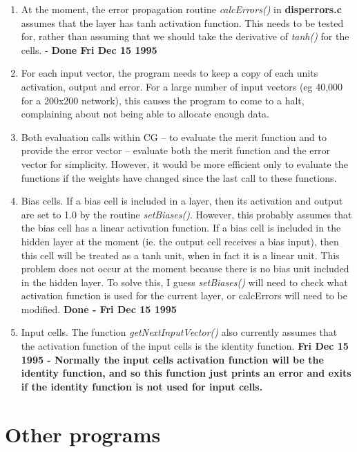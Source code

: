 \documentclass[a4paper]{article}
\begin{document}
\begin{enumerate}
\item 
  At the moment, the error propagation routine {\em calcErrors()} in
  {\bf disperrors.c} assumes that the layer has tanh activation function.
  This needs to be tested for, rather than assuming that we should take
  the derivative of {\em tanh()} for the cells. - {\bf Done Fri Dec 15
    1995}

\item 
  For each input vector, the program needs to keep a copy of each units
  activation, output and error.  For a large number of input vectors (eg
  40,000 for a 200x200 network), this causes the program to come to a
  halt, complaining about not being able to allocate enough data. 


\item Both evaluation calls within CG -- to evaluate the merit
  function and to provide the error vector -- evaluate both the merit
  function and the error vector for simplicity.  However, it would be
  more efficient only to evaluate the functions if the weights have
  changed since the last call to these functions.

\item Bias cells.  If a bias cell is included in a layer, then its
  activation and output are set to 1.0 by the routine {\em setBiases()}.
  However, this probably assumes that the bias cell has a linear
  activation function.  If a bias cell is included in the hidden layer
  at the moment (ie. the output cell receives a bias input), then this
  cell will be treated as a tanh unit, when in fact it is a linear
  unit.   This problem does not occur at the moment because there is
  no bias unit included in the hidden layer.  To solve this, I guess
  {\em setBiases()} will need to check what activation function is used for
  the current layer, or calcErrors will need to be modified.
  \textbf{Done - Fri Dec 15 1995}

\item Input cells.  The function {\em getNextInputVector()} also currently
  assumes that the activation function of the input cells is the
  identity function.  \textbf{Fri Dec 15 1995 - Normally the input
    cells activation function will be the identity function, and so
    this function just prints an error and exits if the identity
    function is not used for input cells.}


\end{enumerate}

\section{Other programs}
\end{document}
